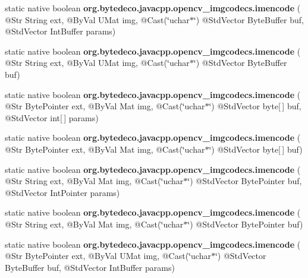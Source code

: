 \begin{DoxyCompactItemize}
static native boolean {\bfseries org.\+bytedeco.\+javacpp.\+opencv\+\_\+imgcodecs.\+imencode} ( @Str String ext, @By\+Val U\+Mat img, @Cast(\char`\"{}uchar$\ast$\char`\"{}) @Std\+Vector Byte\+Buffer buf, @Std\+Vector Int\+Buffer params)
\item 
\mbox{\label{group__imgcodecs_ga6a7d99e7656224c1e92a59a3f6606b44}} 
static native boolean {\bfseries org.\+bytedeco.\+javacpp.\+opencv\+\_\+imgcodecs.\+imencode} ( @Str String ext, @By\+Val U\+Mat img, @Cast(\char`\"{}uchar$\ast$\char`\"{}) @Std\+Vector Byte\+Buffer buf)
\item 
\mbox{\label{group__imgcodecs_ga3ac62d1499552e86f0750fccb81998d1}} 
static native boolean {\bfseries org.\+bytedeco.\+javacpp.\+opencv\+\_\+imgcodecs.\+imencode} ( @Str Byte\+Pointer ext, @By\+Val Mat img, @Cast(\char`\"{}uchar$\ast$\char`\"{}) @Std\+Vector byte\mbox{[}$\,$\mbox{]} buf, @Std\+Vector int\mbox{[}$\,$\mbox{]} params)
\item 
\mbox{\label{group__imgcodecs_ga3484f095d53572680f0a7d6c96ebbf61}} 
static native boolean {\bfseries org.\+bytedeco.\+javacpp.\+opencv\+\_\+imgcodecs.\+imencode} ( @Str Byte\+Pointer ext, @By\+Val Mat img, @Cast(\char`\"{}uchar$\ast$\char`\"{}) @Std\+Vector byte\mbox{[}$\,$\mbox{]} buf)
\item 
\mbox{\label{group__imgcodecs_ga36d538393a7a67b2e5a3c6e984f611af}} 
static native boolean {\bfseries org.\+bytedeco.\+javacpp.\+opencv\+\_\+imgcodecs.\+imencode} ( @Str String ext, @By\+Val Mat img, @Cast(\char`\"{}uchar$\ast$\char`\"{}) @Std\+Vector Byte\+Pointer buf, @Std\+Vector Int\+Pointer params)
\item 
\mbox{\label{group__imgcodecs_gafa76877b26d9e08bf8c42ee7ba83fb5d}} 
static native boolean {\bfseries org.\+bytedeco.\+javacpp.\+opencv\+\_\+imgcodecs.\+imencode} ( @Str String ext, @By\+Val Mat img, @Cast(\char`\"{}uchar$\ast$\char`\"{}) @Std\+Vector Byte\+Pointer buf)
\item 
\mbox{\label{group__imgcodecs_gadd4279c13ff26b745ba02620538dfc53}} 
static native boolean {\bfseries org.\+bytedeco.\+javacpp.\+opencv\+\_\+imgcodecs.\+imencode} ( @Str Byte\+Pointer ext, @By\+Val U\+Mat img, @Cast(\char`\"{}uchar$\ast$\char`\"{}) @Std\+Vector Byte\+Buffer buf, @Std\+Vector Int\+Buffer params)

\end{DoxyCompactItemize}
